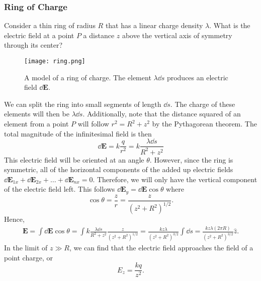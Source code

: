 \documentclass[12pt]{article}
\let\vec\mathbf
\begin{document}
    \subsubsection{Ring of Charge}
    \begin{prob}
    Consider a thin ring of radius $R$ that has a linear charge density $\lambda$. What is the electric field at a point $P$ a distance $z$ above the vertical axis of symmetry through its center?
    \end{prob}
    \begin{figure}[H]
  \centering
      \texttt{[image: ring.png]}
      \caption{A model of a ring of charge. The element $\lambda \dd s$ produces an electric field $\dd \vec E$.}
  \end{figure}

    We can split the ring into small segments of length $\dd s$. The charge of these elements will then be $\lambda \dd s$. Additionally, note that the distance squared of an element from a point $P$ will follow $r^2 = R^2 +z^2$ by the Pythagorean theorem. The total magnitude of the infinitesimal field is then 
    \[\dd \vec E = k\frac{q}{r^2} = k \frac{\lambda \dd s}{R^2 + z^2}\]
    This electric field will be oriented at an angle $\theta$. However, since the ring is symmetric, all of the horizontal components of the added up electric fields $\dd \vec E_{1x} + \dd \vec E_{2x} + \dots + \dd \vec E_{nx} = 0$. Therefore, we will only have the vertical component of the electric field left. This follows $\dd \vec E_y = \dd \vec E \cos\theta$ where 
    \[\cos\theta = \frac{z}{r} = \frac{z}{(z^2 + R^2)^{1/2}}.\]
    Hence, 
    \begin{align*}
    \vec E = \int \dd \vec E \cos\theta  = \int k \frac{\lambda \dd s}{R^2 + z^2} \frac{z}{(z^2 + R^2)^{1/2}} = \frac{kz\lambda}{(z^2 + R^2)^{3/2}} \int \dd s = \frac{kz\lambda (2\pi R)}{(z^2 + R^2)^{3/2}} \hat z.
    \end{align*}
    In the limit of $z\gg R$, we can find that the electric field approaches the field of a point charge, or 
    \[E_z = \frac{kq}{z^2}.\]
\end{document}
